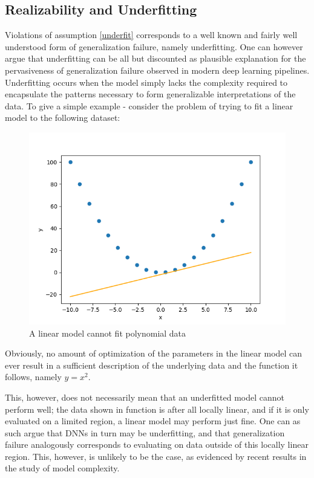 	\subsection{Realizability and Underfitting}
		Violations of assumption \ref{underfit} corresponds to a well known and fairly well understood form of generalization failure, namely underfitting. One can however argue that underfitting can be all but discounted as plausible explanation for the pervasiveness of generalization failure observed in modern deep learning pipelines. Underfitting occurs when the model simply lacks the complexity required to encapsulate the patterns necessary to form generalizable interpretations of the data. To give a simple example - consider the problem of trying to fit a linear model to the following dataset: 
		\begin{figure}[h!]
			\includegraphics[width=\linewidth]{illustrations/regression_example.png}
			\caption[Underfitting]{A linear model cannot fit polynomial data}
			\label{underfit_example}
		\end{figure}
		Obviously, no amount of optimization of the parameters in the linear model can ever result in a sufficient description of the underlying data and the function it follows, namely \(y=x^2\). 
		
		This, however, does not necessarily mean that an underfitted model cannot perform well; the data shown in  function is after all locally linear, and if it is only evaluated on a limited region, a linear model may perform just fine. One can as such argue that DNNs in turn may be underfitting, and that generalization failure analogously corresponds to evaluating on data outside of this locally linear region. This, however, is unlikely to be the case, as evidenced by recent results in the study of model complexity.
		
